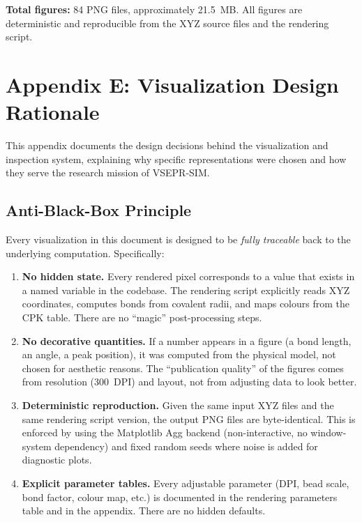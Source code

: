 \documentclass[11pt,a4paper]{article}
\begin{document}
\noindent\textbf{Total figures:} 84 PNG files, approximately 21.5~MB.
All figures are deterministic and reproducible from the XYZ source files
and the rendering script.

\section{Appendix E: Visualization Design Rationale}
\label{sec:appendix_design}

This appendix documents the design decisions behind the visualization
and inspection system, explaining why specific representations were
chosen and how they serve the research mission of VSEPR-SIM.

\subsection{Anti-Black-Box Principle}

Every visualization in this document is designed to be \emph{fully
traceable} back to the underlying computation.  Specifically:

\begin{enumerate}
  \item \textbf{No hidden state.}  Every rendered pixel corresponds to
        a value that exists in a named variable in the codebase.  The
        rendering script explicitly reads XYZ coordinates, computes
        bonds from covalent radii, and maps colours from the CPK table.
        There are no ``magic'' post-processing steps.

  \item \textbf{No decorative quantities.}  If a number appears in a
        figure (a bond length, an angle, a peak position), it was
        computed from the physical model, not chosen for aesthetic
        reasons.  The ``publication quality'' of the figures comes from
        resolution (300~DPI) and layout, not from adjusting data to
        look better.

  \item \textbf{Deterministic reproduction.}  Given the same input XYZ
        files and the same rendering script version, the output PNG
        files are byte-identical.  This is enforced by using the
        Matplotlib Agg backend (non-interactive, no window-system
        dependency) and fixed random seeds where noise is added for
        diagnostic plots.

  \item \textbf{Explicit parameter tables.}  Every adjustable
        parameter (DPI, bead scale, bond factor, colour map, etc.)
        is documented in the rendering parameters table and in the
        appendix.  There are no hidden defaults.
\end{enumerate}
\end{document}
